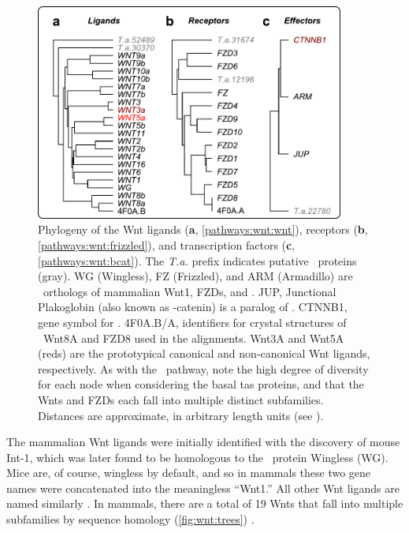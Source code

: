  \begin{figure}[!bt]
  \centering
  \includegraphics[width=4in]{FIGS/pathways/wnt_tree.pdf}
  {\singlespacing 
  \caption[Wnt pathway phylogenetic trees]
    { Phylogeny of the Wnt
      ligands (\textbf{a}, \autoref{pathways:wnt:wnt}),
      receptors (\textbf{b}, \autoref{pathways:wnt:frizzled}), and
      transcription factors (\textbf{c}, \autoref{pathways:wnt:bcat}).
      The \textit{T.a.} prefix indicates putative \ta\ proteins (gray).
      WG (Wingless), FZ (Frizzled), and ARM (Armadillo) are \fly\ orthologs
      of mammalian Wnt1, FZDs, and \bcat.
      JUP, Junctional Plakoglobin (also known as \textgamma-catenin)
      is a paralog of \bcat.
	  CTNNB1, gene symbol for \bcat.
      4F0A.B/A, identifiers for crystal structures of \frog\ Wnt8A
      and FZD8 used in the alignments. Wnt3A and Wnt5A (reds) are the
      prototypical canonical and non-canonical Wnt ligands, respectively. 
      As with the \tgfbsf\ pathway, note the high degree of diversity
      for each node when considering the basal \glspl{ta} proteins, and
      that the Wnts and FZDs each fall into multiple distinct subfamilies.
      Distances are approximate, in arbitrary length units
      (see ).}
  \label{fig:wnt:trees}}
  \end{figure}



The mammalian Wnt ligands were initially identified with the discovery
of mouse Int-1, which was later found to be homologous to the \fly\
protein Wingless (WG). Mice are, of course,
wingless by default, and so in mammals these two gene names
were concatenated into the meaningless ``Wnt1.'' All other Wnt ligands
are named similarly \cite{Mikels2006}. In mammals, there are a total of
19 Wnts that fall into
multiple subfamilies by sequence homology (\autoref{fig:wnt:trees})
\cite{Clevers2006,Malhotra2009}. 


